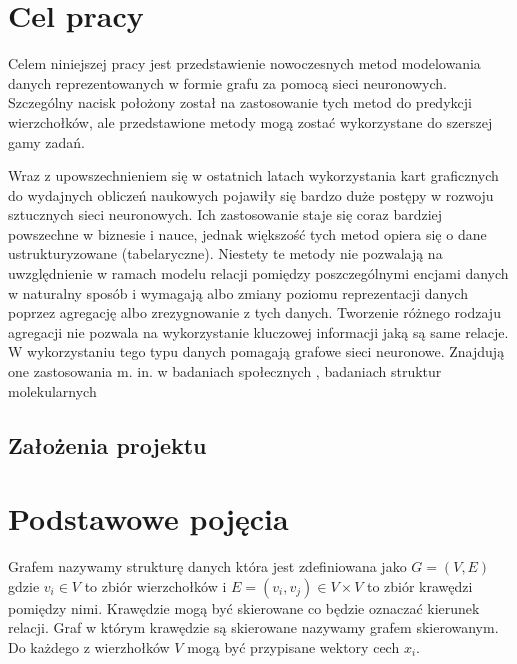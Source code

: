 \documentclass[12pt,a4paper,twoside,openany]{book}
\begin{document}
\clearpage
\thispagestyle{empty}
\mbox{}
\clearpage

\tableofcontents

\clearpage


\chapter{Cel pracy}

Celem niniejszej pracy jest przedstawienie nowoczesnych metod modelowania danych reprezentowanych w formie grafu za pomocą sieci neuronowych.
Szczególny nacisk położony został na zastosowanie tych metod do predykcji wierzchołków, ale przedstawione metody mogą zostać wykorzystane do szerszej gamy zadań.
\indent

Wraz z upowszechnieniem się w ostatnich latach
wykorzystania kart graficznych do wydajnych obliczeń naukowych pojawiły się bardzo duże postępy w rozwoju sztucznych sieci neuronowych.
Ich zastosowanie staje się coraz bardziej powszechne w biznesie i nauce,
jednak większość tych metod opiera się o dane ustrukturyzowane (tabelaryczne).
Niestety te metody nie pozwalają na uwzględnienie w ramach modelu relacji pomiędzy
poszczególnymi encjami danych w naturalny sposób i wymagają albo
zmiany poziomu reprezentacji danych poprzez agregację albo zrezygnowanie z tych danych.
Tworzenie różnego rodzaju agregacji nie pozwala na wykorzystanie kluczowej informacji jaką są same relacje.
W wykorzystaniu tego typu danych pomagają grafowe sieci neuronowe.
Znajdują one zastosowania m. in. w badaniach społecznych \cite{DBLP:journals/corr/abs-1807-05560},
badaniach struktur molekularnych \cite{duvenaud2015convolutional}
\section{Założenia projektu}

\chapter{Podstawowe pojęcia}

Grafem nazywamy strukturę danych która jest zdefiniowana jako
$G = (V, E)$ gdzie $v_i\in V $ to
zbiór wierzchołków i $E = (v_i, v_j) \in V \times V$ to zbiór krawędzi pomiędzy nimi.
\cite{waikhom2021graph}
Krawędzie mogą być skierowane co będzie oznaczać kierunek relacji. Graf w którym krawędzie są skierowane nazywamy grafem
skierowanym. Do każdego z wierzhołków $V$ mogą być przypisane wektory cech $x_i$.
\end{document}
